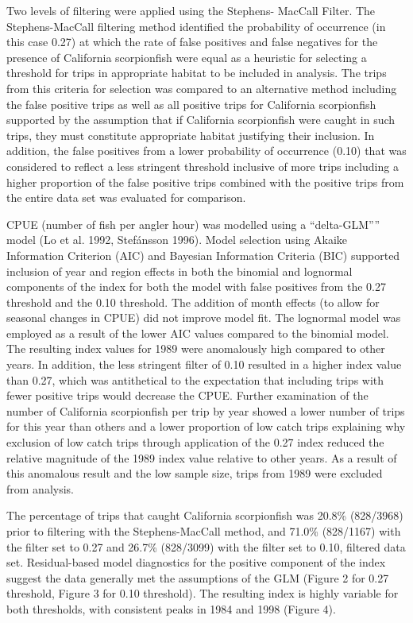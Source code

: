 \documentclass[12pt,]{article}
\begin{document}
Two levels of filtering were applied using the Stephens- MacCall Filter.
The Stephens-MacCall filtering method identified the probability of
occurrence (in this case 0.27) at which the rate of false positives and
false negatives for the presence of California scorpionfish were equal
as a heuristic for selecting a threshold for trips in appropriate
habitat to be included in analysis. The trips from this criteria for
selection was compared to an alternative method including the false
positive trips as well as all positive trips for California scorpionfish
supported by the assumption that if California scorpionfish were caught
in such trips, they must constitute appropriate habitat justifying their
inclusion. In addition, the false positives from a lower probability of
occurrence (0.10) that was considered to reflect a less stringent
threshold inclusive of more trips including a higher proportion of the
false positive trips combined with the positive trips from the entire
data set was evaluated for comparison.

CPUE (number of fish per angler hour) was modelled using a
``delta-GLM'''' model (Lo et al. 1992, Stefánsson 1996). Model selection
using Akaike Information Criterion (AIC) and Bayesian Information
Criteria (BIC) supported inclusion of year and region effects in both
the binomial and lognormal components of the index for both the model
with false positives from the 0.27 threshold and the 0.10 threshold. The
addition of month effects (to allow for seasonal changes in CPUE) did
not improve model fit. The lognormal model was employed as a result of
the lower AIC values compared to the binomial model. The resulting index
values for 1989 were anomalously high compared to other years. In
addition, the less stringent filter of 0.10 resulted in a higher index
value than 0.27, which was antithetical to the expectation that
including trips with fewer positive trips would decrease the CPUE.
Further examination of the number of California scorpionfish per trip by
year showed a lower number of trips for this year than others and a
lower proportion of low catch trips explaining why exclusion of low
catch trips through application of the 0.27 index reduced the relative
magnitude of the 1989 index value relative to other years. As a result
of this anomalous result and the low sample size, trips from 1989 were
excluded from analysis.

The percentage of trips that caught California scorpionfish was 20.8\%
(828/3968) prior to filtering with the Stephens-MacCall method, and
71.0\% (828/1167) with the filter set to 0.27 and 26.7\% (828/3099) with
the filter set to 0.10, filtered data set. Residual-based model
diagnostics for the positive component of the index suggest the data
generally met the assumptions of the GLM (Figure 2 for 0.27 threshold,
Figure 3 for 0.10 threshold). The resulting index is highly variable for
both thresholds, with consistent peaks in 1984 and 1998 (Figure 4).
\end{document}
